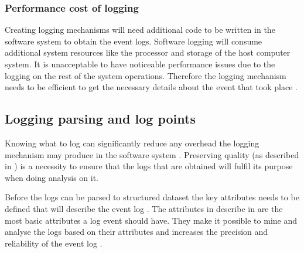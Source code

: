 \subsubsection{Performance cost of logging} 
Creating logging mechanisms will need additional code to be written in the software system to obtain the event logs. Software logging will consume additional system resources like the processor and storage of the host computer system. It is unacceptable to have noticeable performance issues due to the logging on the rest of the system operations. Therefore the logging mechanism needs to be efficient to get the necessary details about the event that took place \cite{Zhu2015,Zhu2019}. 

\clearpage

\subsection{Logging parsing and log points}\label{sec:Ch1_LoggignPoints}
Knowing what to log can significantly reduce any overhead the logging mechanism may produce in the software system \cite{Jia2018, Pecchia2015}. Preserving quality (as described in ) is a necessity to ensure that the logs that are obtained will fulfil its purpose when doing analysis on it.\par Before the logs can be parsed to structured dataset the key attributes needs to be defined that will describe the event log \cite{Bekeneva2020a}. The attributes in describe in  are the most basic attributes a log event should have. They make it possible to mine and analyse the logs based on their attributes and increases the precision and reliability of the event log \cite{Kherbouche2017}.

